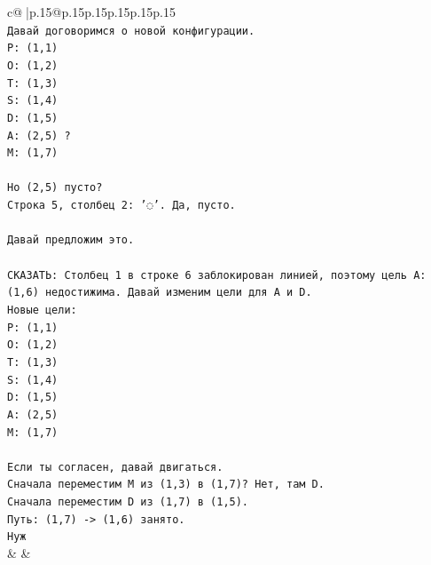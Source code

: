 \documentclass{article}
\begin{document}
{\begin{supertabular}{c@{$\;$}|p{.15\linewidth}@{}p{.15\linewidth}p{.15\linewidth}p{.15\linewidth}p{.15\linewidth}p{.15\linewidth}}
{{{\\ 
\texttt{Давай договоримся о новой конфигурации.} \\
\texttt{P: (1,1)} \\
\texttt{O: (1,2)} \\
\texttt{T: (1,3)} \\
\texttt{S: (1,4)} \\
\texttt{D: (1,5)} \\
\texttt{A: (2,5) ?} \\
\texttt{M: (1,7)} \\
\\ 
\texttt{Но (2,5) пусто?} \\
\texttt{Строка 5, столбец 2: '◌'. Да, пусто.} \\
\\ 
\texttt{Давай предложим это.} \\
\\ 
\texttt{СКАЗАТЬ: Столбец 1 в строке 6 заблокирован линией, поэтому цель A: (1,6) недостижима. Давай изменим цели для A и D.} \\
\texttt{Новые цели:} \\
\texttt{P: (1,1)} \\
\texttt{O: (1,2)} \\
\texttt{T: (1,3)} \\
\texttt{S: (1,4)} \\
\texttt{D: (1,5)} \\
\texttt{A: (2,5)} \\
\texttt{M: (1,7)} \\
\\ 
\texttt{Если ты согласен, давай двигаться.} \\
\texttt{Сначала переместим M из (1,3) в (1,7)? Нет, там D.} \\
\texttt{Сначала переместим D из (1,7) в (1,5).} \\
\texttt{Путь: (1,7) {-}> (1,6) занято.} \\
\texttt{Нуж} \\
            }
        }
    }
    & & \\ \\


\end{supertabular}}
\end{document}
